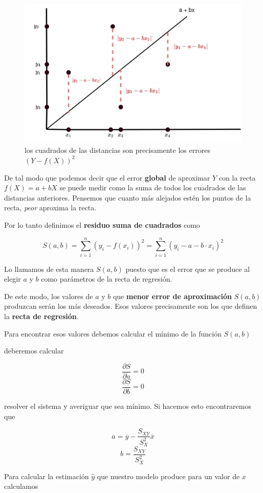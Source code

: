 \documentclass[]{book}
\theoremstyle{plain}
\theoremstyle{definition}
\begin{document}
\begin{figure}
\centering
\includegraphics[width=4.6875in,height=\textheight]{img/least_squares.png}
\caption{los cuadrados de las distancias son precisamente los errores
\((Y- f(X))^2\)}
\end{figure}

De tal modo que podemos decir que el error \textbf{global} de aproximar
\(Y\) con la recta \(f(X)= a+bX\) se puede medir como la suma de todos
los cuadrados de las distancias anteriores. Pensemos que cuanto más
alejados estén los puntos de la recta, \emph{peor} aproxima la recta.

Por lo tanto definimos el \textbf{residuo suma de cuadrados} como

\[S(a,b) =  \sum^n_{i=1} (y_i - f(x_i))^2 =  \sum^n_{i=1} (y_i - a -b\cdot x_i)^2\]

Lo llamamos de esta manera \(S(a,b)\) puesto que es el error que se
produce al elegir \(a\) y \(b\) como parámetros de la recta de
regresión.

De este modo, los valores de \(a\) y \(b\) que \textbf{menor error de
aproximación} \(S(a,b)\) produzcan serán los más deseados. Esos valores
precisamente son los que definen la \textbf{recta de regresión}.

Para encontrar esos valores debemos calcular el mínimo de la función
\(S(a,b)\)

deberemos calcular

\[\frac {\partial S}{\partial a}=0\]
\[\frac {\partial S}{\partial b}=0\]

resolver el sistema y averiguar que sea mínimo. Si hacemos esto
encontraremos que

\[a = \overline{y} - \frac{S_{XY}}{S^2_X} \overline x\]
\[b = \frac{S_{XY}}{S^2_X}\]

Para calcular la estimación \(\hat y\) que nuestro modelo produce para
un valor de \(x\) calculamos
\end{document}
